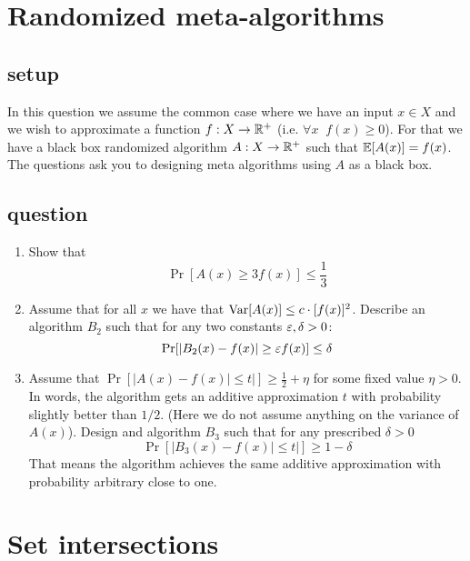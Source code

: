 

\section{Randomized meta-algorithms}
\subsection*{setup}
In this question we assume the common case where we have an input $x \in X$  
and we wish to approximate a function $f:X \rightarrow {\mathbb{R}}^+$ (i.e. $\forall x\;\;f(x) \ge 0$).
For that we have a black box randomized algorithm $A:X\rightarrow {\mathbb{R}}^+$ such that ${\mathbb E}[A(x)] = f(x)$.
The questions ask you to designing meta algorithms using $A$ as a black box. 
\subsection*{question}
\begin{enumerate}
\item Show that
\[
\Pr[A(x) \ge 3f(x)] \le \frac{1}{3}
\]
\item Assume that for all $x$ we have that ${\operatorname{Var}}[A(x)] \le c\cdot [f(x)]^2$.
Describe an algorithm $B_2$ such that for any two constants $\varepsilon,\delta > 0$:
\[
\Pr[|B_2(x) - f(x)| \ge \varepsilon f(x)] \le \delta
\]
\item Assume that $\Pr[|A(x) - f(x) | \le t|] \ge \frac{1}{2}+\eta$ for some fixed value $\eta > 0$.
In words, the algorithm gets an additive approximation $t$ with probability slightly better than $1/2$.
(Here we do not assume anything on the variance of $A(x)$).
Design and algorithm $B_3$ such that for any prescribed $\delta >0$
\[
\Pr[|B_3(x) - f(x) | \le t|] \ge 1 - \delta
\]
That means the algorithm achieves the same additive approximation with probability arbitrary close to one.
\end{enumerate}


\pagebreak

\section{Set intersections} 
